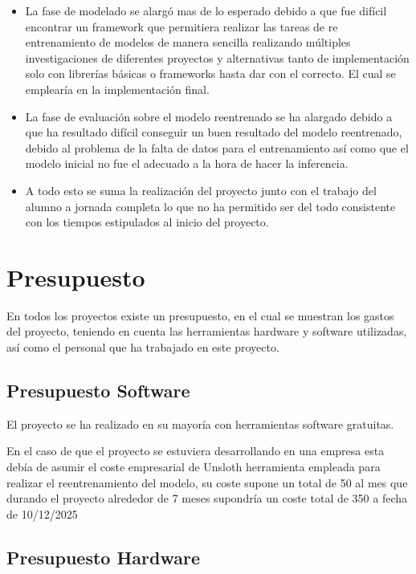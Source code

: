  \begin{itemize}
     \item La fase de modelado se alargó mas de lo esperado debido a que fue difícil encontrar un framework que permitiera realizar las tareas de re entrenamiento de modelos de manera sencilla realizando múltiples investigaciones de diferentes proyectos y alternativas tanto de implementación solo con librerías básicas o frameworks hasta dar con el correcto. El cual se emplearía en la implementación final.

     \item La fase de evaluación sobre el modelo reentrenado se ha alargado debido a que ha resultado difícil conseguir un buen resultado del modelo reentrenado, debido al problema de la falta de datos para el entrenamiento así como que el modelo inicial no fue el adecuado a la hora de hacer la inferencia.

     \item A todo esto se suma la realización del proyecto junto con el trabajo del alumno a jornada completa lo que no ha permitido ser del todo consistente con los tiempos estipulados al inicio del proyecto.
 \end{itemize}

\section{Presupuesto}

En todos los proyectos existe un presupuesto, en el cual se muestran los gastos del proyecto, teniendo en cuenta las herramientas hardware y software utilizadas, así como el personal que ha trabajado en este proyecto.
\subsection{Presupuesto Software}
El proyecto se ha realizado en su mayoría con herramientas software gratuitas.

En el caso de que el proyecto se estuviera desarrollando en una empresa esta debía de asumir el coste empresarial de Unsloth \cite{Unsloth} herramienta empleada para realizar el reentrenamiento del modelo, su coste supone un total de 50\EUR{} al mes que durando el proyecto alrededor de 7 meses supondría un coste total de 350\EUR{} a fecha de 10/12/2025

\subsection{Presupuesto Hardware}

